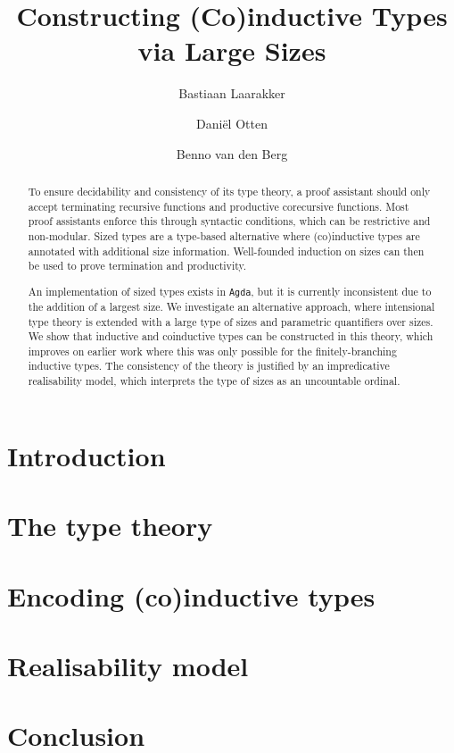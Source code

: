 \documentclass[pdfa,a4paper,UKenglish,cleveref,autoref,thm-restate]{lipics-v2021}
\title{Constructing (Co)inductive Types via Large Sizes}
\author{Bastiaan Laarakker}{LIACS, Leiden University, The Netherlands}{b.g.laarakker@liacs.leidenuniv.nl}{https://orcid.org/0009-0005-3079-8505}{This work was partially supported by the Dutch Research Council (NWO) under grant number\ VI.Veni.232.286 (ChEOpS).}
\author{Dani\"el Otten}{ILLC, University of Amsterdam, The Netherlands \and \url{http://otten.co}}{daniel@otten.co}{https://orcid.org/0000-0003-2557-3959}{}
\author{Benno van den Berg}{ILLC, University of Amsterdam, The Netherlands \and \url{https://staff.fnwi.uva.nl/b.vandenberg3/}}{b.vandenberg3@uva.nl}{}{}
\begin{document}
    
    
    \maketitle
    
    \begin{abstract}
        To ensure decidability and consistency of its type theory, a proof assistant should only accept terminating recursive functions and productive corecursive functions.
        Most proof assistants enforce this through syntactic conditions, which can be restrictive and non-modular.
        Sized types are a type-based alternative where (co)inductive types are annotated with additional size information.
        Well-founded induction on sizes can then be used to prove termination and productivity.

        An implementation of sized types exists in \texttt{Agda}, but it is currently inconsistent due to the addition of a largest size.
        We investigate an alternative approach, where intensional type theory is extended with a large type of sizes and parametric quantifiers over sizes.
        We show that inductive and coinductive types can be constructed in this theory, which improves on earlier work where this was only possible for the finitely-branching inductive types.
        The consistency of the theory is justified by an impredicative realisability model, which interprets the type of sizes as an uncountable ordinal.
    \end{abstract}
    
    \section{Introduction}
    \label{sec:intro}
    
    
    \section{The type theory} 
    \label{sec:type-theory}
    
    
    \section{Encoding (co)inductive types}
    \label{sec:encoding}
    
    
    \section{Realisability model}
    \label{sec:model}
    
    
    \section{Conclusion} 
    \label{sec:conclusion}
    

    
    
    \appendix
    
\end{document}
